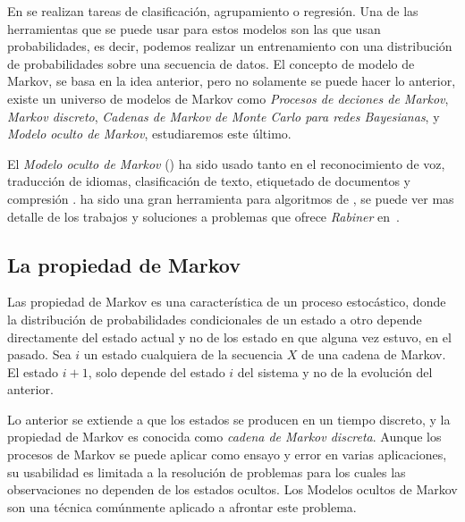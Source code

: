 
En \machinelearning se realizan tareas de clasificación, agrupamiento o regresión. Una de las herramientas que se puede usar para estos modelos son las que usan probabilidades, es decir, podemos realizar un entrenamiento con una distribución de probabilidades sobre una secuencia de datos. El concepto de modelo de Markov, se basa en la idea anterior, pero no solamente se puede hacer lo anterior, existe un universo de modelos de Markov como \emph{Procesos de deciones de Markov}, \emph{Markov discreto}, \emph{Cadenas de Markov de Monte Carlo para redes Bayesianas}, y  \emph{Modelo oculto de Markov}, estudiaremos este último.

El \emph{Modelo oculto de Markov} (\HMM) ha sido usado tanto en el reconocimiento de voz, traducción de idiomas, clasificación de texto, etiquetado de documentos y compresión \MLkhanna. \HMM ha sido una gran herramienta para algoritmos de \machinelearning, se puede ver mas detalle de los trabajos y soluciones a problemas que ofrece \emph{Rabiner} en~\cite{Rabiner1990}.





\subsection{La propiedad de Markov}



Las propiedad de Markov es una característica de un proceso estocástico, donde la distribución de probabilidades condicionales de un estado a otro depende directamente del estado actual y no de los estado en que alguna vez estuvo, en el pasado. Sea $i$ un estado cualquiera de la secuencia $X$ de una cadena de Markov.  El estado $i+1$, solo depende del estado $i$ del sistema y no de la evolución del anterior.


Lo anterior se extiende a que los estados se producen en un tiempo discreto, y la propiedad de Markov es conocida como \emph{cadena de Markov discreta}. Aunque los procesos de Markov se puede aplicar como ensayo y error en varias aplicaciones, su usabilidad es limitada a la resolución de problemas para los cuales las observaciones no dependen de los estados ocultos. Los Modelos ocultos de Markov son una técnica comúnmente aplicado a afrontar este problema.







